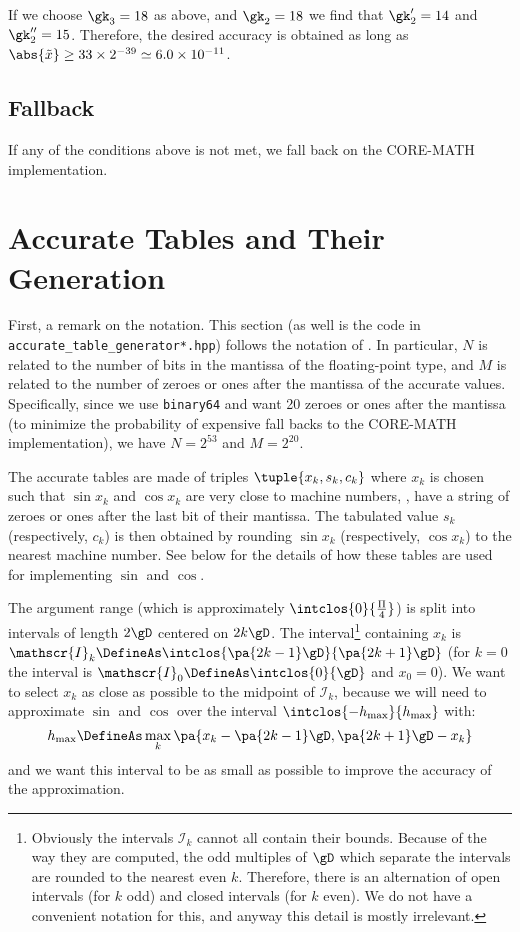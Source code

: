 \documentclass[10pt, a4paper, twoside]{basestyle}
\newcommand{\red}[1]{\tilde{#1}}
\begin{document}
If we choose $\gk_3 = 18$ as above, and $\gk_2 = 18$ we find that $\gk'_2 = 14$ and $\gk''_2 = 15$.  Therefore, the desired accuracy is obtained as long as $\abs{\red x} \geq 33 \times 2^{-39} \simeq 6.0 \times 10^{-11}$.

\subsection*{Fallback}

If any of the conditions above is not met, we fall back on the CORE-MATH implementation.

\section*{Accurate Tables and Their Generation}

First, a remark on the notation.  This section (as well is the code in \linebreak\texttt{accurate\_table\_generator*.hpp}) follows the notation of \cite{StehléZimmermann2005}.  In particular, $N$ is related to the number of bits in the mantissa of the floating-point type, and $M$ is related to the number of zeroes or ones after the mantissa of the accurate values.  Specifically, since we use \texttt{binary64} and want 20 zeroes or ones after the mantissa (to minimize the probability of expensive fall backs to the CORE-MATH implementation), we have $N = 2^{53}$ and $M = 2^{20}$. 

The accurate tables are made of triples $\tuple{x_k, s_k, c_k}$ where $x_k$ is chosen such that $\sin x_k$ and $\cos x_k$ are very close to machine numbers, \idest, have a string of zeroes or ones after the last bit of their mantissa.  The tabulated value $s_k$ (respectively, $c_k$) is then obtained by rounding $\sin x_k$ (respectively, $\cos x_k$) to the nearest machine number.  See  below for the details of how these tables are used for implementing $\sin$ and $\cos$.

The argument range (which is approximately $\intclos{0}{\frac{\Pi}{4}}$) is split into intervals of length $2 \gD$ centered on $2 k \gD$.  The interval\footnote{Obviously the intervals $\mathscr{I}_k$ cannot all contain their bounds.  Because of the way they are computed, the odd multiples of $\gD$ which separate the intervals are rounded to the nearest even $k$.  Therefore, there is an alternation of open intervals (for $k$ odd) and closed intervals (for $k$ even).  We do not have a convenient notation for this, and anyway this detail is mostly irrelevant.} containing $x_k$ is $\mathscr{I}_k \DefineAs \intclos{\pa{2 k - 1}\gD}{\pa{2 k + 1}\gD}$ (for $k = 0$ the interval is $\mathscr{I}_0 \DefineAs \intclos{0}{\gD}$ and $x_0 = 0$).  We want to select $x_k$ as close as possible to the midpoint of $\mathscr{I}_k$, because we will need to approximate $\sin$ and $\cos$ over the interval $\intclos{-h_{\text{max}}}{h_{\text{max}}}$ with:
\[
h_{\text{max}} \DefineAs \max_k \pa{x_k - \pa{2 k - 1} \gD, \pa{2 k + 1} \gD - x_k}
\]
and we want this interval to be as small as possible to improve the accuracy of the approximation.
\end{document}
